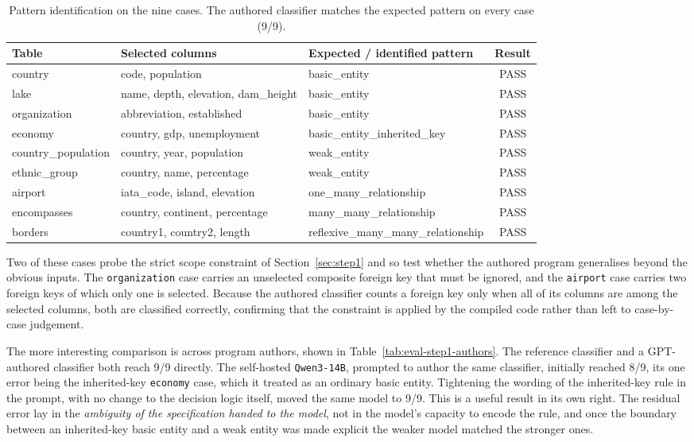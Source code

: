 \begin{table}[htbp]
\centering
\caption{Pattern identification on the nine cases. The authored classifier matches the expected pattern on every case (9/9).}
\label{tab:eval-step1-cases}
\small
\begin{tabularx}{\textwidth}{|l|X|l|c|}
\hline
\textbf{Table} & \textbf{Selected columns} & \textbf{Expected / identified pattern} & \textbf{Result} \\
\hline
country & code, population & basic\_entity & PASS \\ \hline
lake & name, depth, elevation, dam\_height & basic\_entity & PASS \\ \hline
organization & abbreviation, established & basic\_entity & PASS \\ \hline
economy & country, gdp, unemployment & basic\_entity\_inherited\_key & PASS \\ \hline
country\_population & country, year, population & weak\_entity & PASS \\ \hline
ethnic\_group & country, name, percentage & weak\_entity & PASS \\ \hline
airport & iata\_code, island, elevation & one\_many\_relationship & PASS \\ \hline
encompasses & country, continent, percentage & many\_many\_relationship & PASS \\ \hline
borders & country1, country2, length & reflexive\_many\_many\_relationship & PASS \\ \hline
\end{tabularx}
\end{table}

Two of these cases probe the strict scope constraint of Section~\ref{sec:step1} and so test whether the authored program generalises beyond the obvious inputs. The \texttt{organization} case carries an unselected composite foreign key that must be ignored, and the \texttt{airport} case carries two foreign keys of which only one is selected. Because the authored classifier counts a foreign key only when all of its columns are among the selected columns, both are classified correctly, confirming that the constraint is applied by the compiled code rather than left to case-by-case judgement.

The more interesting comparison is across program authors, shown in Table~\ref{tab:eval-step1-authors}. The reference classifier and a GPT-authored classifier both reach 9/9 directly. The self-hosted \texttt{Qwen3-14B}, prompted to author the same classifier, initially reached 8/9, its one error being the inherited-key \texttt{economy} case, which it treated as an ordinary basic entity. Tightening the wording of the inherited-key rule in the prompt, with no change to the decision logic itself, moved the same model to 9/9. This is a useful result in its own right. The residual error lay in the \emph{ambiguity of the specification handed to the model}, not in the model's capacity to encode the rule, and once the boundary between an inherited-key basic entity and a weak entity was made explicit the weaker model matched the stronger ones.

